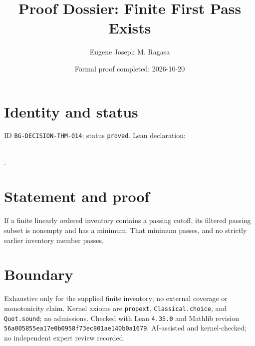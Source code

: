 \documentclass[11pt]{article}
\title{Proof Dossier: Finite First Pass Exists}\author{Eugene Joseph M. Ragasa}\date{Formal proof completed: 2026-10-20}
\begin{document}
\maketitle
\section{Identity and status}
ID \texttt{BG-DECISION-THM-014}; status \texttt{proved}. Lean declaration:
\par{}\\
{\tiny{}}.
\section{Statement and proof}
If a finite linearly ordered inventory contains a passing cutoff, its filtered passing
subset is nonempty and has a minimum. That minimum passes, and no strictly earlier
inventory member passes.
\section{Boundary}
Exhaustive only for the supplied finite inventory; no external coverage or monotonicity
claim. Kernel axioms are \texttt{propext}, \texttt{Classical.choice}, and \texttt{Quot.sound}; no admissions. Checked with Lean \texttt{4.35.0} and Mathlib revision
\texttt{56a005855ea17e0b0958f73ec801ae140b0a1679}. AI-assisted and kernel-checked;
no independent expert review recorded.
\end{document}
